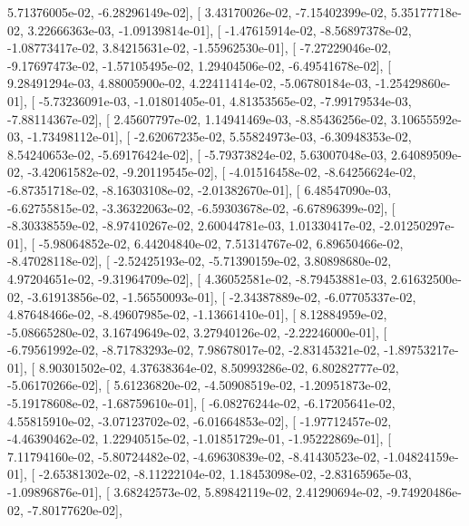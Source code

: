\documentclass{article}
\begin{document}
          5.71376005e-02,  -6.28296149e-02],
       [  3.43170026e-02,  -7.15402399e-02,   5.35177718e-02,
          3.22666363e-03,  -1.09139814e-01],
       [ -1.47615914e-02,  -8.56897378e-02,  -1.08773417e-02,
          3.84215631e-02,  -1.55962530e-01],
       [ -7.27229046e-02,  -9.17697473e-02,  -1.57105495e-02,
          1.29404506e-02,  -6.49541678e-02],
       [  9.28491294e-03,   4.88005900e-02,   4.22411414e-02,
         -5.06780184e-03,  -1.25429860e-01],
       [ -5.73236091e-03,  -1.01801405e-01,   4.81353565e-02,
         -7.99179534e-03,  -7.88114367e-02],
       [  2.45607797e-02,   1.14941469e-03,  -8.85436256e-02,
          3.10655592e-03,  -1.73498112e-01],
       [ -2.62067235e-02,   5.55824973e-03,  -6.30948353e-02,
          8.54240653e-02,  -5.69176424e-02],
       [ -5.79373824e-02,   5.63007048e-03,   2.64089509e-02,
         -3.42061582e-02,  -9.20119545e-02],
       [ -4.01516458e-02,  -8.64256624e-02,  -6.87351718e-02,
         -8.16303108e-02,  -2.01382670e-01],
       [  6.48547090e-03,  -6.62755815e-02,  -3.36322063e-02,
         -6.59303678e-02,  -6.67896399e-02],
       [ -8.30338559e-02,  -8.97410267e-02,   2.60044781e-03,
          1.01330417e-02,  -2.01250297e-01],
       [ -5.98064852e-02,   6.44204840e-02,   7.51314767e-02,
          6.89650466e-02,  -8.47028118e-02],
       [ -2.52425193e-02,  -5.71390159e-02,   3.80898680e-02,
          4.97204651e-02,  -9.31964709e-02],
       [  4.36052581e-02,  -8.79453881e-03,   2.61632500e-02,
         -3.61913856e-02,  -1.56550093e-01],
       [ -2.34387889e-02,  -6.07705337e-02,   4.87648466e-02,
         -8.49607985e-02,  -1.13661410e-01],
       [  8.12884959e-02,  -5.08665280e-02,   3.16749649e-02,
          3.27940126e-02,  -2.22246000e-01],
       [ -6.79561992e-02,  -8.71783293e-02,   7.98678017e-02,
         -2.83145321e-02,  -1.89753217e-01],
       [  8.90301502e-02,   4.37638364e-02,   8.50993286e-02,
          6.80282777e-02,  -5.06170266e-02],
       [  5.61236820e-02,  -4.50908519e-02,  -1.20951873e-02,
         -5.19178608e-02,  -1.68759610e-01],
       [ -6.08276244e-02,  -6.17205641e-02,   4.55815910e-02,
         -3.07123702e-02,  -6.01664853e-02],
       [ -1.97712457e-02,  -4.46390462e-02,   1.22940515e-02,
         -1.01851729e-01,  -1.95222869e-01],
       [  7.11794160e-02,  -5.80724482e-02,  -4.69630839e-02,
         -8.41430523e-02,  -1.04824159e-01],
       [ -2.65381302e-02,  -8.11222104e-02,   1.18453098e-02,
         -2.83165965e-03,  -1.09896876e-01],
       [  3.68242573e-02,   5.89842119e-02,   2.41290694e-02,
         -9.74920486e-02,  -7.80177620e-02],
\end{document}
